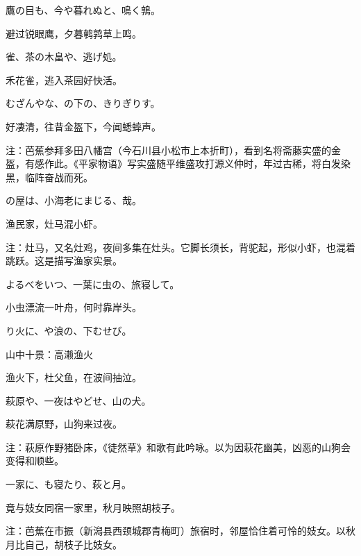 \begin{haiku}
    {\FH 鷹の目も、今や暮れぬと、鳴く鶉。}

    {\FK 避过锐眼鹰，夕暮鹌鹑草上鸣。}
\end{haiku}

\begin{haiku}
    {\FH {}雀、茶の木畠や、逃げ処。}

    {\FK 禾花雀，逃入茶园好快活。}
\end{haiku}

\begin{haiku}
    {\FH むざんやな、の下の、きりぎりす。}

    {\FK 好凄清，往昔金盔下，今闻蟋蟀声。}

    {\FT 注：芭蕉参拜多田八幡宫（今石川县小松市上本折町），看到名将斋藤实盛的金盔，有感作此。《平家物语》写实盛随平维盛攻打源义仲时，年过古稀，将白发染黑，临阵奋战而死。}
\end{haiku}

\begin{haiku}
    {\FH {}の屋は、小海老にまじる、哉。}

    {\FK 渔民家，灶马混小虾。}

    {\FT 注：灶马，又名灶鸡，夜间多集在灶头。它脚长须长，背驼起，形似小虾，也混着跳跃。这是描写渔家实景。}
\end{haiku}

\begin{haiku}
    {\FH よるべをいつ、一葉に虫の、旅寝して。}

    {\FK 小虫漂流一叶舟，何时靠岸头。}
\end{haiku}

\begin{haiku}
    {\FH {}り火に、や浪の、下むせび。}

    {\FK 山中十景：高濑渔火}

    {\FK 渔火下，杜父鱼，在波间抽泣。}
\end{haiku}

\begin{haiku}
    {\FH 萩原や、一夜はやどせ、山の犬。}

    {\FK 萩花满原野，山狗来过夜。}

    {\FT 注：萩原作野猪卧床，《徒然草》和歌有此吟咏。以为因萩花幽美，凶恶的山狗会变得和顺些。}
\end{haiku}

\begin{haiku}
    {\FH 一家に、も寝たり、萩と月。}

    {\FK 竟与妓女同宿一家里，秋月映照胡枝子。}

    {\FT 注：芭蕉在市振（新潟县西颈城郡青梅町）旅宿时，邻屋恰住着可怜的妓女。以秋月比自己，胡枝子比妓女。}
\end{haiku}

